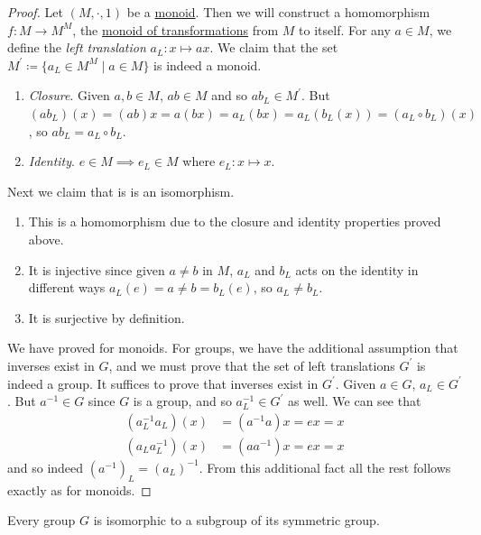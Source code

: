   \begin{proof}
    Let $(M, \cdot, 1)$ be a \hyperref[def:monoid]{monoid}. Then we will construct a homomorphism $f: M \to M^M$, the \hyperref[def:monoid-of-transformations]{monoid of transformations} from $M$ to itself. For any $a \in M$, we define the \textit{left translation} $a_L : x \mapsto ax$. We claim that the set $M^\prime \coloneqq \{a_L \in M^M \mid a \in M \}$ is indeed a monoid. 
    \begin{enumerate}
      \item \textit{Closure}. Given $a, b \in M$, $ab \in M$ and so $ab_L \in M^\prime$. But $(ab_L)(x) = (ab)x = a (bx) = a_L (bx) = a_L (b_L (x)) = (a_L \circ b_L)(x)$, so $ab_L = a_L \circ b_L$. 
      \item \textit{Identity}. $e \in M \implies e_L \in M$ where $e_L : x \mapsto x$. 
    \end{enumerate}
    Next we claim that is is an isomorphism. 
    \begin{enumerate}
      \item This is a homomorphism due to the closure and identity properties proved above. 
      \item It is injective since given $a \neq b$ in $M$, $a_L$ and $b_L$ acts on the identity in different ways $a_L(e) = a \neq b = b_L (e)$, so $a_L \neq b_L$. 
      \item It is surjective by definition. 
    \end{enumerate}
    We have proved for monoids. For groups, we have the additional assumption that inverses exist in $G$, and we must prove that the set of left translations $G^\prime$ is indeed a group. It suffices to prove that inverses exist in $G^\prime$. Given $a \in G$, $a_L \in G^\prime$. But $a^{-1} \in G$ since $G$ is a group, and so $a^{-1}_L \in G^\prime$ as well. We can see that 
    \begin{align}
      (a^{-1}_L a_L) (x) & = (a^{-1} a) x = ex = x \\
      (a_L a^{-1}_L) (x) & = (a a^{-1}) x = ex = x
    \end{align}
    and so indeed $(a^{-1})_L = (a_L)^{-1}$. From this additional fact all the rest follows exactly as for monoids. 
  \end{proof}

  \begin{corollary}[Cayley]
    \label{thm:cayley}
    Every group $G$ is isomorphic to a subgroup of its symmetric group. 
  \end{corollary}

